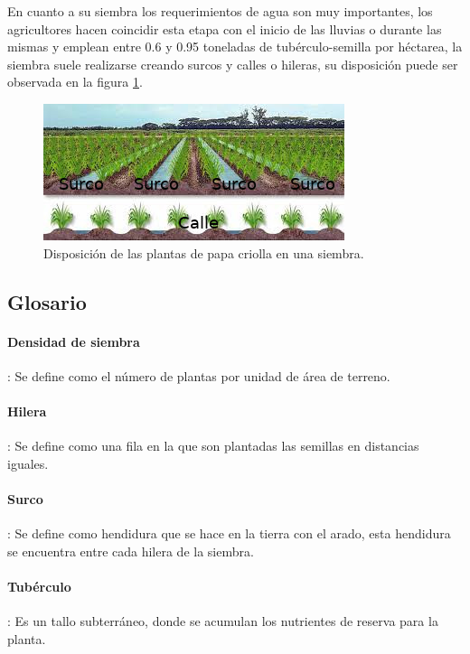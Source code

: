 En cuanto a su siembra los requerimientos de agua son muy importantes, los agricultores hacen coincidir esta etapa con el inicio de las lluvias o durante las mismas y emplean entre 0.6 y 0.95 toneladas de tubérculo-semilla por héctarea, la siembra suele realizarse creando surcos y calles o hileras, su disposición puede ser observada en la figura \ref{fig:surcos}.

\clearpage

\begin{figure}[h!]
	\centering
	\includegraphics[scale=0.8]{surcos.jpeg}
	\caption{Disposición de las plantas de papa criolla en una siembra.}
	\label{fig:surcos}
\end{figure}

\subsection{Glosario}

\paragraph{Densidad de siembra}: Se define como el número de plantas por unidad de área de terreno.

\paragraph{Hilera}: Se define como una fila en la que son plantadas las semillas en distancias iguales.

\paragraph{Surco}: Se define como hendidura que se hace en la tierra con el arado, esta hendidura se encuentra entre cada hilera de la siembra.

\paragraph{Tubérculo}: Es un tallo subterráneo, donde se acumulan los nutrientes de reserva para la planta.



